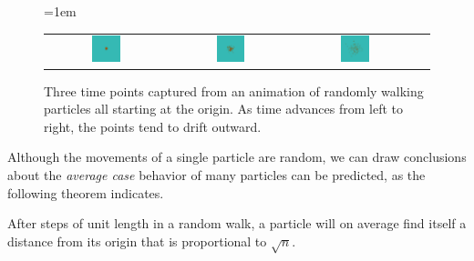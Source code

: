 \begin{figure}[h]
\centering
\mySfFamily
\tabcolsep=1em
\begin{tabular}{c c c c}
\includegraphics[width=0.25\textwidth]{../images_CMYK/random_walk_particles_1} & \includegraphics[width=0.25\textwidth]{../images_CMYK/random_walk_particles_2} & \includegraphics[width=0.25\textwidth]{../images_CMYK/random_walk_particles_4}\\
\end{tabular}
\caption{Three time points captured from an animation of randomly walking particles all starting at the origin. As time advances from left to right, the points tend to drift outward.}
\label{fig:random_walk_multiple_particles}
\end{figure}

Although the movements of a single particle are random, we can draw conclusions about the \textit{average case} behavior of many particles can be predicted, as the following theorem indicates.

\begin{namedtheorem}
After  steps of unit length in a random walk, a particle will on average find itself a distance from its origin that is proportional to $\sqrt{n}$.
\end{namedtheorem}

\fudgespace

\begin{note}\end{note}

